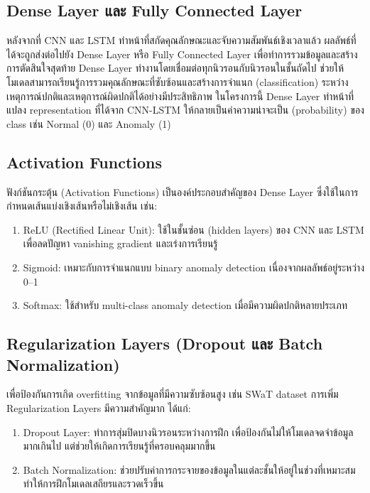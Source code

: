 \subsection{Dense Layer และ Fully Connected Layer}
\hspace{2em} หลังจากที่ CNN และ LSTM ทำหน้าที่สกัดคุณลักษณะและจับความสัมพันธ์เชิงเวลาแล้ว ผลลัพธ์ที่ได้จะถูกส่งต่อไปยัง Dense Layer หรือ Fully Connected Layer เพื่อทำการรวมข้อมูลและสร้างการตัดสินใจสุดท้าย Dense Layer ทำงานโดยเชื่อมต่อทุกนิวรอนกับนิวรอนในชั้นถัดไป ช่วยให้โมเดลสามารถเรียนรู้การรวมคุณลักษณะที่ซับซ้อนและสร้างการจำแนก (classification) ระหว่างเหตุการณ์ปกติและเหตุการณ์ผิดปกติได้อย่างมีประสิทธิภาพ
ในโครงการนี้ Dense Layer ทำหน้าที่แปลง representation ที่ได้จาก CNN-LSTM ให้กลายเป็นค่าความน่าจะเป็น (probability) ของ class เช่น Normal (0) และ Anomaly (1)

\subsection{Activation Functions}
\hspace{2em} ฟังก์ชันกระตุ้น (Activation Functions) เป็นองค์ประกอบสำคัญของ Dense Layer ซึ่งใช้ในการกำหนดเส้นแบ่งเชิงเส้นหรือไม่เชิงเส้น เช่น:
\begin{enumerate}
  \item ReLU (Rectified Linear Unit): ใช้ในชั้นซ่อน (hidden layers) ของ CNN และ LSTM เพื่อลดปัญหา vanishing gradient และเร่งการเรียนรู้
  \item Sigmoid: เหมาะกับการจำแนกแบบ binary anomaly detection เนื่องจากผลลัพธ์อยู่ระหว่าง 0–1
  \item Softmax: ใช้สำหรับ multi-class anomaly detection เมื่อมีความผิดปกติหลายประเภท
\end{enumerate}

\subsection{Regularization Layers (Dropout และ Batch Normalization)}
\hspace{2em} เพื่อป้องกันการเกิด overfitting จากข้อมูลที่มีความซับซ้อนสูง เช่น SWaT dataset การเพิ่ม Regularization Layers มีความสำคัญมาก ได้แก่:
\begin{enumerate}
  \item Dropout Layer: ทำการสุ่มปิดบางนิวรอนระหว่างการฝึก เพื่อป้องกันไม่ให้โมเดลจดจำข้อมูลมากเกินไป แต่ช่วยให้เกิดการเรียนรู้ที่ครอบคลุมมากขึ้น
  \item Batch Normalization: ช่วยปรับค่าการกระจายของข้อมูลในแต่ละชั้นให้อยู่ในช่วงที่เหมาะสม ทำให้การฝึกโมเดลเสถียรและรวดเร็วขึ้น
\end{enumerate}

